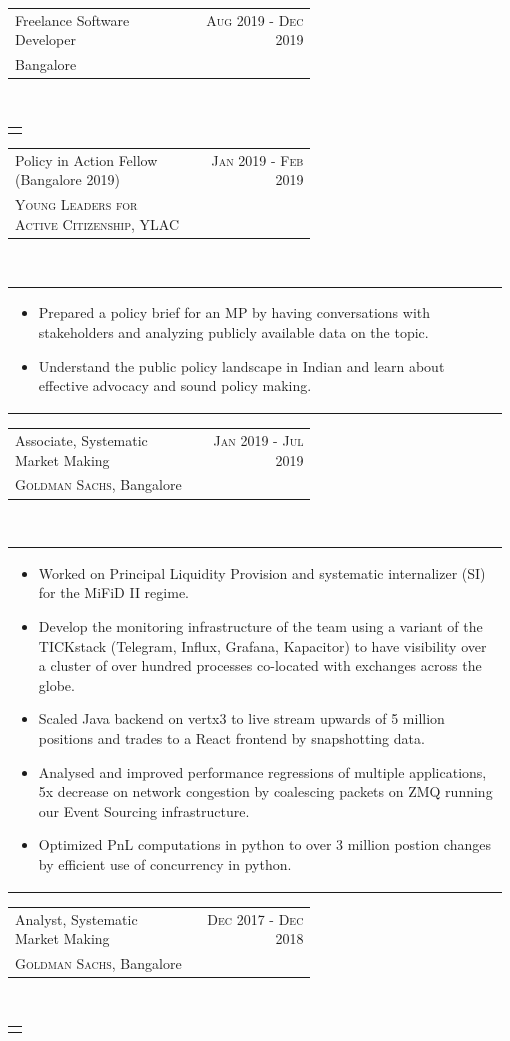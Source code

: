 \documentclass[a4paper]{article} %
\newcommand{\verticalspacing}{-0.25cm}
\newcommand{\bulletspace}{0.7cm}
\newcommand{\projectheadspacing}{6.9cm}
\newcommand{\cproject}[5]{%
    \begin{tabular}{p{0.60\linewidth}r}
        \textcolor{NavyBlue}{\small #2} & \multicolumn{1}{m{ \projectheadspacing{} }}{\raggedleft \small {\textsc{#1}}}\\
        \small {#3} & \small {#4}
    \end{tabular}\\
    \begin{tabular}{p{0.98\linewidth}}
    \vspace{-0.3cm}
        \small{#5}
    \end{tabular}
    \vspace{\verticalspacing{}}
}
\begin{document}
\cproject
      {Aug 2019 - Dec 2019}
      {Freelance Software Developer}
      {Bangalore}
      {}
      {%
      }

\cproject
      {Jan 2019 - Feb 2019}
      {Policy in Action Fellow (Bangalore 2019)}
      {\textsc{Young Leaders for Active Citizenship}, YLAC}
      {}
      {%
        \begin{itemize}[leftmargin=\bulletspace{}]
            \item Prepared a policy brief for an MP by having conversations with stakeholders and analyzing publicly available data on the topic.
            \item Understand the public policy landscape in Indian and learn about effective advocacy and sound policy making.
        \end{itemize}
      }

\cproject
      {Jan 2019 - Jul 2019}
      {Associate, Systematic Market Making}
      {\textsc{Goldman Sachs}, Bangalore}
      {}
      {%
        \begin{itemize}[leftmargin=\bulletspace{}]
          \item Worked on Principal Liquidity Provision and systematic internalizer (SI) for the MiFiD II regime.
          \item Develop the monitoring infrastructure of the team using a variant of the TICKstack
              (Telegram, Influx, Grafana, Kapacitor) to have visibility over a cluster of over hundred
              processes co-located with exchanges across the globe.
          \item Scaled Java backend on vertx3 to live stream upwards of 5 million positions
              and trades to a React frontend by snapshotting data.
          \item Analysed and improved performance regressions of multiple applications,
              5x decrease on network congestion by coalescing packets on ZMQ running our Event Sourcing
              infrastructure.
          \item Optimized PnL computations in python to over 3 million postion changes by efficient
              use of concurrency in python.
        \end{itemize}
      }

\cproject
      {Dec 2017 - Dec 2018}
      {Analyst, Systematic Market Making}
      {\textsc{Goldman Sachs}, Bangalore}
      {}
      {%
      }
\end{document}
